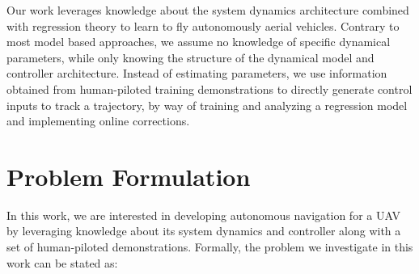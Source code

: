 \documentclass[letterpaper, 10 pt, conference]{ieeeconf}  %
\newcommand\NB[1]{$\spadesuit$\footnote{NB: #1}}
\begin{document}
Our work leverages knowledge about the system dynamics architecture combined with regression theory to learn to fly autonomously aerial vehicles.
Contrary to most model based approaches, we assume no knowledge of specific dynamical parameters, while only knowing the structure of the dynamical model and controller architecture. 
Instead of estimating parameters, we use information obtained from human-piloted training demonstrations to directly generate control inputs to track a trajectory, by way of training and analyzing a regression model and implementing online corrections.



\section{Problem Formulation} \label{sec:prob}
In this work, we are interested in developing autonomous navigation for a UAV by leveraging knowledge about its system dynamics and controller along with a set of human-piloted demonstrations.
Formally, the problem we investigate in this work can be stated as:
\end{document}
